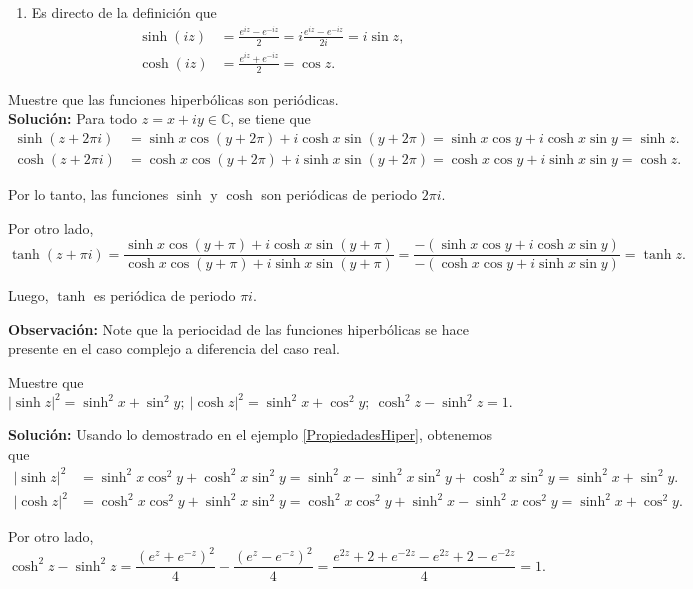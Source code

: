 \begin{ejemplo}
\begin{enumerate}
\item Es directo de la definición que
\begin{align*}
\sinh(iz) &= \frac{e^{iz} - e^{-iz}}{2} = i \frac{e^{iz} - e^{-iz}}{2i} = i \sin z, \\
\cosh(iz) &= \frac{e^{iz} + e^{-iz}}{2} = \cos z.
\end{align*}

\end{enumerate}
\end{ejemplo}

\begin{ejemplo}
Muestre que las funciones hiperbólicas son periódicas.
\\

\textbf{Solución:} Para todo $z = x+iy \in \mathbb{C}$, se tiene que 
\begin{align*}
\sinh(z + 2\pi i ) &= \sinh x \cos(y+ 2\pi) + i \cosh x \sin(y + 2\pi) = \sinh x \cos y + i \cosh x \sin y = \sinh z .\\
\cosh(z + 2\pi i) &= \cosh x \cos(y+ 2\pi) + i \sinh x \sin(y+ 2\pi) = \cosh x \cos y + i \sinh x \sin y = \cosh z.
\end{align*}

Por lo tanto, las funciones $\sinh$ y $\cosh$ son periódicas de periodo $2\pi i$.

Por otro lado, 
\begin{equation*}
\tanh(z + \pi i) = \frac{\sinh x \cos(y+ \pi) + i \cosh x \sin(y + \pi)}{\cosh x \cos(y+ \pi) + i \sinh x \sin(y+ \pi)} = \frac{-(\sinh x \cos y + i \cosh x \sin y)}{-(\cosh x \cos y + i \sinh x \sin y)} = \tanh z.
\end{equation*}

Luego, $\tanh$ es periódica de periodo $\pi i$.

\end{ejemplo}

\textbf{Observación:} Note que la periocidad de las funciones hiperbólicas se hace presente en el caso complejo a diferencia del caso real.

\begin{ejemplo}
Muestre que 
$$|\sinh z|^2 = \sinh^2 x + \sin^2 y; ~ |\cosh z|^2 = \sinh^2 x + \cos^2 y;~ \cosh^2 z - \sinh^2 z = 1.$$

\textbf{Solución:} Usando lo demostrado en el ejemplo \ref{PropiedadesHiper}, obtenemos que 
\begin{align*}
|\sinh z|^2 &= \sinh^2 x \cos^2 y +  \cosh^2 x \sin^2 y = \sinh^2 x - \sinh^2 x \sin^2 y + \cosh^2 x \sin^2 y = \sinh^2 x + \sin^2 y.\\
|\cosh z|^2 &= \cosh^2 x \cos^2 y + \sinh^2 x \sin^2 y = \cosh^2 x \cos^2 y + \sinh^2 x - \sinh^2 x \cos^2 y = \sinh^2 x + \cos^2 y.
\end{align*}

Por otro lado,
$$\cosh^2 z - \sinh^2 z  = \frac{(e^{z} + e^{-z})^2}{4} - \frac{(e^{z} - e^{-z})^2}{4} = \frac{e^{2z} + 2 + e^{-2z} - e^{2z} + 2 - e^{-2z}}{4} = 1.$$

\end{ejemplo}

